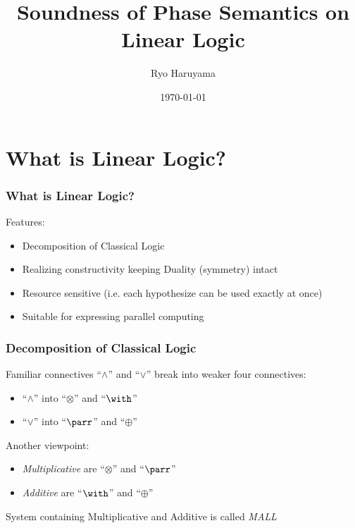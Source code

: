 \documentclass[dvipdfmx,cjk]{beamer}
\theoremstyle{example}
\begin{document}
\title[LL]{Soundness of Phase Semantics on Linear Logic} 
\author[Haruyama]{Ryo Haruyama}
\date{\today}

\begin{frame}
  \titlepage
\end{frame}

\begin{frame}
  \tableofcontents
\end{frame}

                          \section{What is Linear Logic?}
                          
\begin{frame}
  \frametitle{What is Linear Logic?}
  Features:

  \begin{itemize}
    \item Decomposition of Classical Logic 
    \item Realizing constructivity keeping Duality (symmetry) intact 
    \item Resource sensitive (i.e. each hypothesize can be used exactly at once) 
    \item Suitable for expressing parallel computing
  \end{itemize}
  
\end{frame}

\begin{frame}
  \frametitle{Decomposition of Classical Logic} 

    Familiar connectives ``$\wedge$'' and ``$\vee$'' break into weaker four connectives:

    \begin{itemize}
      \item ``$\wedge$'' into ``$\otimes$'' and ``$\with$'' 
      \item ``$\vee$''   into ``$\parr$''   and ``$\oplus$'' 
    \end{itemize}

    Another viewpoint:

    \begin{itemize}
      \item \textit{Multiplicative} are ``$\otimes$'' and ``$\parr$'' 
      \item \textit{Additive} are ``$\with$''   and ``$\oplus$'' 
    \end{itemize}

    System containing Multiplicative and Additive is called \textit{MALL}
    
\end{frame}
\end{document}
